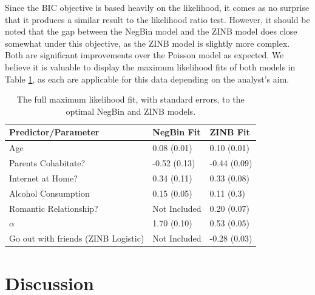 \documentclass[12pt, titlepage]{article}
\begin{document}
	Since the BIC objective is based heavily on the likelihood, it comes as no surprise that it produces a similar result to the likelihood ratio test. However, it should be noted that the gap between the NegBin model and the ZINB model does close somewhat under this objective, as the ZINB model is slightly more complex. Both are significant improvements over the Poisson model as expected. We believe it is valuable to display the maximum likelihood fits of both models in Table \ref{MLE}, as each are applicable for this data depending on the analyst's aim. 
	\begin{table}[h!]
		\centering
		\begin{tabular}{|l|l|l|}
			\hline
			Predictor/Parameter & NegBin Fit & ZINB Fit \\
			\hline 
			Age & 0.08 (0.01) & 0.10 (0.01)\\
			Parents Cohabitate? & -0.52 (0.13) & -0.44 (0.09) \\
			Internet at Home? & 0.34 (0.11) & 0.33 (0.08) \\
			Alcohol Consumption& 0.15 (0.05) & 0.11 (0.3) \\
			Romantic Relationship?& Not Included & 0.20 (0.07) \\
			$\alpha$ & 1.70 (0.10) & 0.53 (0.05) \\
			Go out with friends (ZINB Logistic) & Not Included & -0.28 (0.03) \\
			\hline
		\end{tabular}
		\caption{The full maximum likelihood fit, with standard errors, to the optimal NegBin and ZINB models.}
		\label{MLE}
	\end{table}
	\section{Discussion}
	
\end{document}
